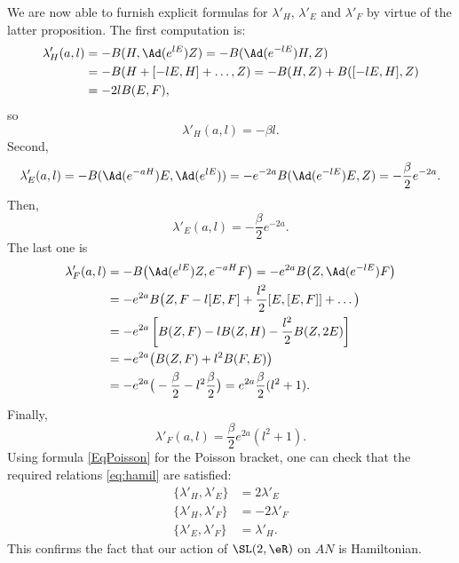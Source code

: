 We are now able to furnish explicit formulas for $\lambda'_H$, $\lambda'_E$ and $\lambda'_F$ by virtue of the latter proposition.  The first computation is:
\begin{equation}
\begin{aligned}
  \lambda'_H(a,l)&=-B(H,\Ad(e^{lE})Z)
                =-B( \Ad(e^{-lE})H,Z )\\
        &=-B(H+[-lE,H]+\ldots,Z)
        =-B(H,Z)+B([-lE,H],Z)\\
        &=-2lB(E,F),
\end{aligned}
\end{equation}
so
\begin{equation}   \label{EqlamHal}
  \lambda'_H(a,l)=-\beta l.
\end{equation}
Second,
\begin{equation}
  \lambda'_E(a,l)=-B(\Ad(e^{-aH})E,\Ad(e^{lE}))
        =-e^{-2a}B(\Ad(e^{-lE})E,Z)
        =-\frac{\beta}{2}e^{-2a}.
\end{equation}
Then,
\begin{equation}  \label{EqlamEal}
\lambda'_E(a,l)=-\frac{\beta}{2}e^{-2a}.
\end{equation}
The last one is
\begin{equation}
\begin{aligned}
\lambda'_F(a,l)&=-B\big(  \Ad(e^{lE})Z,e^{-aH}F  \big)
              =-e^{2a}B\big(Z,  \Ad(e^{-lE})F   \big)\\
          &=-e^{2a}B\big(Z, F-l[E,F] +\frac{l^2}{2} [E,[E,F]]+\ldots  \big)\\
          &=-e^{2a}\left[     B(Z,F)-lB(Z,H)-\frac{l^2}{2}B(Z,2E)        \right]\\
          &=-e^{2a}\big(  B(Z,F)+l^2B(F,E)   \big)\\
          &=-e^{2a}\big(  -\frac{\beta}{2}-l^2\frac{\beta}{2}   \big)
          =e^{2a}\frac{\beta}{2}(l^2+1).
\end{aligned}
\end{equation}
Finally,
\begin{equation}  \label{EqlamFal}
\lambda'_F(a,l)=\frac{\beta}{2}e^{2a}(l^2+1).
\end{equation}
Using formula \eqref{EqPoisson} for the Poisson bracket, one can check that the required relations \eqref{eq:hamil} are satisfied:
\begin{subequations}  \label{pg:explic_com_lamb}
\begin{align}
  \{\lambda'_H,\lambda'_E\}&=2\lambda'_E\\
  \{\lambda'_H,\lambda'_F\}&=-2\lambda'_F\\
  \{\lambda'_E,\lambda'_F\}&=\lambda'_H.
\end{align}
\end{subequations}
This confirms the fact that our action of $\SL(2,\eR)$ on $AN$ is Hamiltonian.

